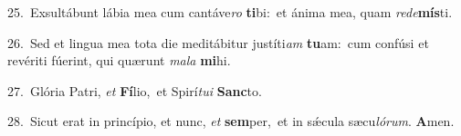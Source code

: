 {\numbfont\textcolor{\numbcolor}{25.}}~Exsultábunt lábia mea cum cantáve\textit{ro} \textbf{ti}\-bi:~\star et ánima mea, quam \textit{red}\-\textit{e}\textbf{mís}ti.\par
{\numbfont\textcolor{\numbcolor}{26.}}~Sed et lingua mea tota die meditábitur justíti\textit{am} \textbf{tu}\-am:~\star cum confúsi et revériti fúerint, qui quærunt \textit{ma}\-\textit{la} \textbf{mi}\-hi.\par
{\numbfont\textcolor{\numbcolor}{27.}}~Glória Patri, \textit{et} \textbf{Fí}\-lio,~\star et Spirí\-\textit{tu}\-\textit{i} \textbf{Sanc}\-to.\par
{\numbfont\textcolor{\numbcolor}{28.}}~Sicut erat in princípio, et nunc, \textit{et} \textbf{sem}\-per,~\star et in sǽcula sæcu\-\textit{ló}\-\textit{rum}. \textbf{A}\-men.\par
